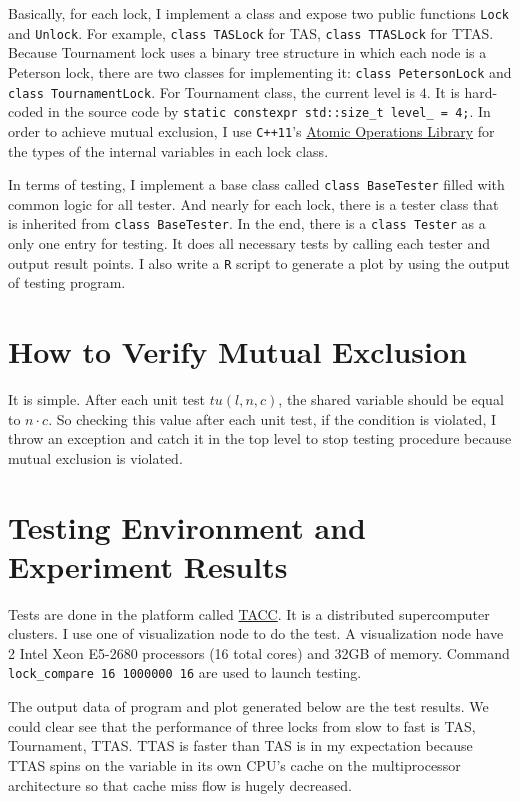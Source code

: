\documentclass[a4paper]{report}
\begin{document}
Basically, for each lock, I implement a class and expose two public functions \lstinline{Lock} and \lstinline{Unlock}.
For example, \lstinline{class TASLock} for TAS, \lstinline{class TTASLock} for TTAS.
Because Tournament lock uses a binary tree structure in which each node is a Peterson lock, there are two classes for implementing it: \lstinline{class PetersonLock} and \lstinline{class TournamentLock}.
For Tournament class, the current level is $4$.
It is hard-coded in the source code by \lstinline{static constexpr std::size_t level_ = 4;}.
In order to achieve mutual exclusion, I use \lstinline{C++11}'s \href{http://en.cppreference.com/w/cpp/atomic}{Atomic Operations Library} for the types of the internal variables in each lock class.

In terms of testing, I implement a base class called \lstinline{class BaseTester} filled with common logic for all tester.
And nearly for each lock, there is a tester class that is inherited from \lstinline{class BaseTester}.
In the end, there is a \lstinline{class Tester} as a only one entry for testing.
It does all necessary tests by calling each tester and output result points.
I also write a \lstinline{R} script to generate a plot by using the output of testing program.

\section*{How to Verify Mutual Exclusion}
It is simple.
After each unit test $tu(l, n, c)$, the shared variable should be equal to $n \cdot c$.
So checking this value after each unit test, if the condition is violated, I throw an exception and catch it in the top level to stop testing procedure because mutual exclusion is violated.

\section*{Testing Environment and Experiment Results}
Tests are done in the platform called \href{https://www.tacc.utexas.edu/}{TACC}.
It is a distributed supercomputer clusters.
I use one of visualization node to do the test.
A visualization node have 2 Intel Xeon E5-2680 processors (16 total cores) and 32GB of memory.
Command \lstinline{lock_compare 16 1000000 16} are used to launch testing.

The output data of program and plot generated below are the test results.
We could clear see that the performance of three locks from slow to fast is TAS, Tournament, TTAS.
TTAS is faster than TAS is in my expectation because TTAS spins on the variable in its own CPU's cache on the multiprocessor architecture so that cache miss flow is hugely decreased.
\end{document}
